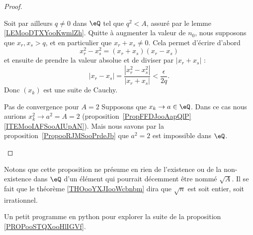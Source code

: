 \begin{proof}
\begin{subproof}
            Soit par ailleurs \( q\neq 0\) dans \( \eQ\) tel que \( q^2<A\), assuré par le lemme \ref{LEMooDTXYooKwmlZh}. Quitte à augmenter la valeur de \( n_0\), nous supposons que \( x_r,x_s>q\), et en particulier que \( x_r+x_s\neq 0\). Cela permet d'écrire d'abord
            \begin{equation}
                x_r^2-x_s^2=(x_r+x_s)(x_r-x_s)
            \end{equation}
            et ensuite de prendre la valeur absolue et de diviser par \( | x_r+x_s |\) :
            \begin{equation}
                | x_r-x_s |=\frac{ | x_r^2-x_s^2 | }{ | x_r+x_s | }<\frac{ \epsilon }{ 2q }.
            \end{equation}
            Donc \( (x_k)\) est une suite de Cauchy.
        \item[Pas de convergence pour \( A=2\)]
            Supposons que \( x_k\to a\in \eQ\). Dans ce cas nous aurions \( x_k^2\to a^2=A=2\) (proposition~\ref{PropFFDJooAapQlP}\ref{ITEMooIAFSooAIUpAN}). Mais nous savons par la proposition~\ref{PropooRJMSooPrdeJb} que \( a^2=2\) est impossible dans \( \eQ\).
    \end{subproof}
\end{proof}

Notons que cette proposition ne présume en rien de l'existence ou de la non-existence dans \( \eQ\) d'un élément qui pourrait décemment être nommé \( \sqrt{ A }\). Il se fait que le théorème \ref{THOooYXJIooWcbnbm} dira que \( \sqrt{ n }\) est soit entier, soit irrationnel.

\begin{normaltext}
    Un petit programme en python pour explorer la suite de la proposition \ref{PROPooSTQXooHlIGVf}.
    
\end{normaltext}
